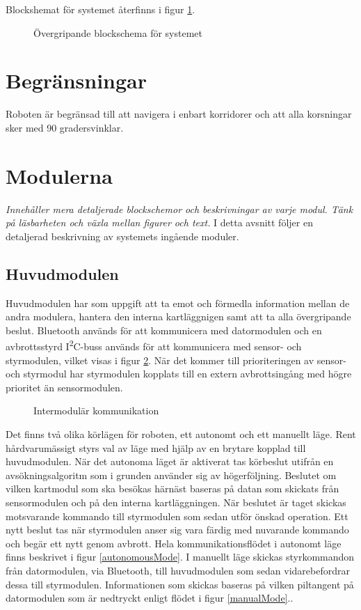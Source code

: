 \documentclass[11pt]{article}
\begin{document}
\begin{flushleft}
Blockshemat för systemet återfinns i figur \ref{blockSystem}.

\begin{figure}[htbp]
\centering
\noindent\resizebox{1\linewidth}{!}{
	}
	\caption{Övergripande blockschema för systemet}	\label{blockSystem}
\end{figure}

\section{Begränsningar}
Roboten är begränsad till att navigera i enbart korridorer och att alla korsningar sker med 90 gradersvinklar.

\section{Modulerna}
\textit{Innehåller mera detaljerade blockschemor och beskrivningar av varje modul. Tänk på läsbarheten och växla mellan figurer och text.}
I detta avsnitt följer en detaljerad beskrivning av systemets ingående moduler. 

\subsection{Huvudmodulen}
Huvudmodulen har som uppgift att ta emot och förmedla information mellan de andra modulera, hantera den interna kartläggnigen samt att ta alla övergripande beslut. Bluetooth\textsuperscript{\circledR} används för att kommunicera med datormodulen och en avbrottsstyrd I\textsuperscript{2}C-buss används för att kommunicera med sensor- och styrmodulen, vilket visas i figur \ref{communication}. När det kommer till prioriteringen av sensor- och styrmodul har styrmodulen kopplats till en extern avbrottsingång med högre prioritet än sensormodulen.

\begin{figure}[htbp]
\noindent\resizebox{.97\textwidth}{!}{
	}
	\caption{Intermodulär kommunikation \label{communication}}
\end{figure}

Det finns två olika körlägen för roboten, ett autonomt och ett manuellt läge. Rent hårdvarumässigt styrs val av läge med hjälp av en brytare kopplad till huvudmodulen. När det autonoma läget är aktiverat tas körbeslut utifrån en avsökningsalgoritm som i grunden använder sig av högerföljning. Beslutet om vilken kartmodul som ska besökas härnäst baseras på datan som skickats från sensormodulen och på den interna kartläggningen. När beslutet är taget skickas motsvarande kommando till styrmodulen som sedan utför önskad operation. Ett nytt beslut tas när styrmodulen anser sig vara färdig med nuvarande kommando och begär ett nytt genom avbrott. Hela kommunikationsflödet i autonomt läge finns beskrivet i figur \ref{autonomousMode}. I manuellt läge skickas styrkommandon från datormodulen, via Bluetooth\textsuperscript{\circledR}, till huvudmodulen som sedan vidarebefordrar dessa till styrmodulen. Informationen som skickas baseras på vilken piltangent på datormodulen som är nedtryckt enligt flödet i figur \ref{manualMode}..


\end{flushleft}
\end{document}
